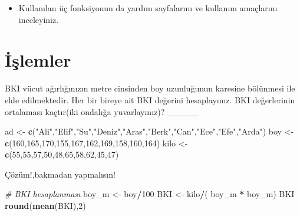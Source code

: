 \documentclass[
  oneside]{book}
\newenvironment{Shaded}{\begin{snugshade}}{\end{snugshade}}
\newcommand{\CommentTok}[1]{\textcolor[rgb]{0.56,0.35,0.01}{\textit{#1}}}
\newcommand{\DecValTok}[1]{\textcolor[rgb]{0.00,0.00,0.81}{#1}}
\newcommand{\FunctionTok}[1]{\textcolor[rgb]{0.13,0.29,0.53}{\textbf{#1}}}
\newcommand{\NormalTok}[1]{#1}
\newcommand{\OtherTok}[1]{\textcolor[rgb]{0.56,0.35,0.01}{#1}}
\newcommand{\SpecialCharTok}[1]{\textcolor[rgb]{0.81,0.36,0.00}{\textbf{#1}}}
\newcommand{\StringTok}[1]{\textcolor[rgb]{0.31,0.60,0.02}{#1}}
\providecommand{\tightlist}{%
  \setlength{\itemsep}{0pt}\setlength{\parskip}{0pt}}
\begin{document}
\begin{itemize}
\tightlist
\item
  Kullanılan üç fonksiyonun da yardım sayfalarını ve kullanım amaçlarını inceleyiniz.
\end{itemize}

\hypertarget{iux15flemler}{%
\section{İşlemler}\label{iux15flemler}}

BKI vücut ağırlığınızın metre cinsinden boy uzunluğunun karesine bölünmesi ile elde edilmektedir. Her bir bireye ait BKI değerini hesaplayınız. BKI değerlerinin ortalaması kaçtır(iki ondalığa yuvarlayınız)? \_\_\_\_\_

\begin{Shaded}
\begin{Highlighting}[]
\NormalTok{ad  }\OtherTok{\textless{}{-}}  \FunctionTok{c}\NormalTok{(}\StringTok{"Ali"}\NormalTok{,}\StringTok{"Elif"}\NormalTok{,}\StringTok{"Su"}\NormalTok{,}\StringTok{"Deniz"}\NormalTok{,}\StringTok{"Aras"}\NormalTok{,}\StringTok{"Berk"}\NormalTok{,}\StringTok{"Can"}\NormalTok{,}\StringTok{"Ece"}\NormalTok{,}\StringTok{"Efe"}\NormalTok{,}\StringTok{"Arda"}\NormalTok{)}
\NormalTok{boy }\OtherTok{\textless{}{-}} \FunctionTok{c}\NormalTok{(}\DecValTok{160}\NormalTok{,}\DecValTok{165}\NormalTok{,}\DecValTok{170}\NormalTok{,}\DecValTok{155}\NormalTok{,}\DecValTok{167}\NormalTok{,}\DecValTok{162}\NormalTok{,}\DecValTok{169}\NormalTok{,}\DecValTok{158}\NormalTok{,}\DecValTok{160}\NormalTok{,}\DecValTok{164}\NormalTok{)}
\NormalTok{kilo }\OtherTok{\textless{}{-}} \FunctionTok{c}\NormalTok{(}\DecValTok{55}\NormalTok{,}\DecValTok{55}\NormalTok{,}\DecValTok{57}\NormalTok{,}\DecValTok{50}\NormalTok{,}\DecValTok{48}\NormalTok{,}\DecValTok{65}\NormalTok{,}\DecValTok{58}\NormalTok{,}\DecValTok{62}\NormalTok{,}\DecValTok{45}\NormalTok{,}\DecValTok{47}\NormalTok{)}
\end{Highlighting}
\end{Shaded}

Çözüm!,bakmadan yapmalısın!

\begin{Shaded}
\begin{Highlighting}[]
\CommentTok{\# BKI  hesaplanması}
\NormalTok{boy\_m  }\OtherTok{\textless{}{-}}\NormalTok{ boy}\SpecialCharTok{/}\DecValTok{100}
\NormalTok{BKI }\OtherTok{\textless{}{-}}\NormalTok{ kilo}\SpecialCharTok{/}\NormalTok{( boy\_m }\SpecialCharTok{*}\NormalTok{ boy\_m)}
\NormalTok{BKI}
\FunctionTok{round}\NormalTok{(}\FunctionTok{mean}\NormalTok{(BKI),}\DecValTok{2}\NormalTok{)}
\end{Highlighting}
\end{Shaded}
\end{document}

